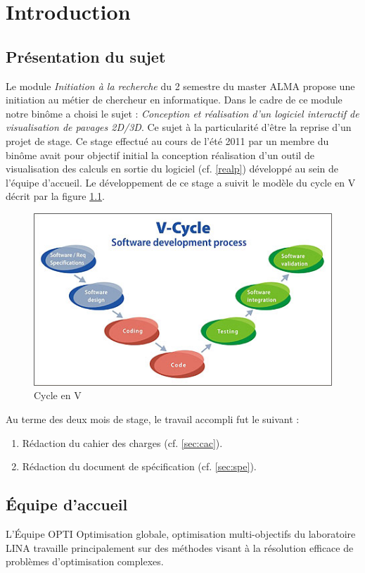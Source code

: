 \chapter{Introduction}

\section{Présentation du sujet}
Le module \emph{Initiation à la recherche} du 2 semestre du master \textsc{ALMA} propose une initiation au métier de chercheur en informatique. Dans le cadre de ce module notre binôme a choisi le sujet : \emph{Conception et réalisation d’un logiciel interactif de visualisation de pavages 2D/3D}. Ce sujet à la particularité d'être la reprise d'un projet de stage. Ce stage effectué au cours de l'été 2011 par un membre du binôme avait pour objectif initial la conception réalisation d'un outil de visualisation des calculs en sortie du logiciel  \realpaver (cf. \ref{realp}) développé au sein de l'équipe d'accueil. Le développement de ce stage a suivit le modèle du cycle en V décrit par la figure \ref{fig:vcycle}.
\begin{figure}[htbp]
\centering
\includegraphics[scale=1]{img/vcycle}
\caption{Cycle en V}
\label{fig:vcycle}
\end{figure}
\clearpage
Au terme des deux mois de stage, le travail accompli fut le suivant :
\begin{enumerate}
\item 
Rédaction du cahier des charges (cf. \ref{sec:cac}).
\item
Rédaction du document de spécification (cf. \ref{sec:spe}).
\end{enumerate} 

\section{\'Equipe d'accueil}
L'\'Equipe \textsc{OPTI} Optimisation globale, optimisation multi-objectifs\cite{opti} du laboratoire \textsc{LINA}\cite{lina} travaille principalement sur des méthodes visant à la résolution efficace de problèmes d’optimisation complexes.  

